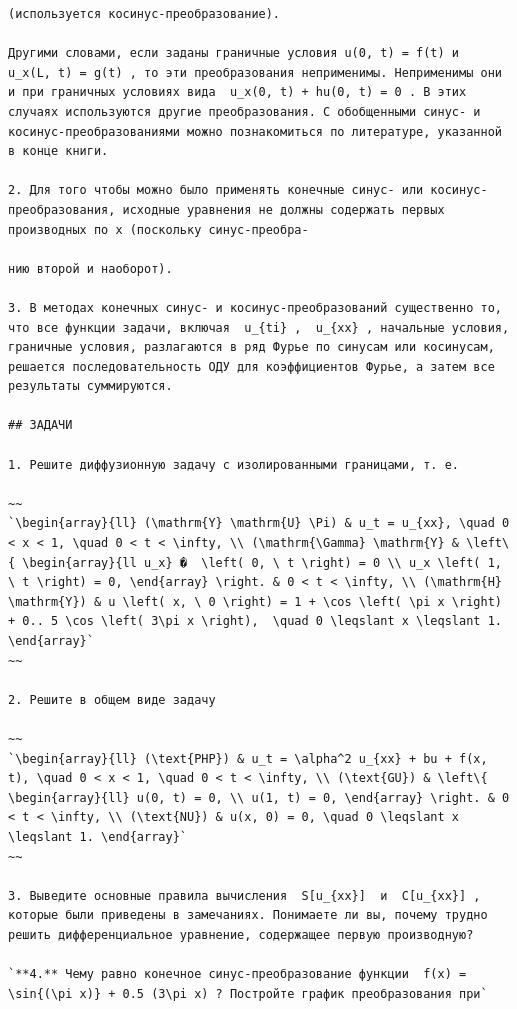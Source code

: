 \documentclass[
  ukrainian,
]{article}
\begin{document}
\begin{verbatim}
(используется косинус-преобразование).

Другими словами, если заданы граничные условия u(0, t) = f(t) и  u_x(L, t) = g(t) , то эти преобразования неприменимы. Неприменимы они и при граничных условиях вида  u_x(0, t) + hu(0, t) = 0 . В этих случаях используются другие преобразования. С обобщенными синус- и косинус-преобразованиями можно познакомиться по литературе, указанной в конце книги.

2. Для того чтобы можно было применять конечные синус- или косинус-преобразования, исходные уравнения не должны содержать первых производных по x (поскольку синус-преобра-

нию второй и наоборот).

3. В методах конечных синус- и косинус-преобразований существенно то, что все функции задачи, включая  u_{ti} ,  u_{xx} , начальные условия, граничные условия, разлагаются в ряд Фурье по синусам или косинусам, решается последовательность ОДУ для коэффициентов Фурье, а затем все результаты суммируются.

## ЗАДАЧИ

1. Решите диффузионную задачу с изолированными границами, т. е.

~~
`\begin{array}{ll} (\mathrm{Y} \mathrm{U} \Pi) & u_t = u_{xx}, \quad 0 < x < 1, \quad 0 < t < \infty, \\ (\mathrm{\Gamma} \mathrm{Y} & \left\{ \begin{array}{ll u_x} �  \left( 0, \ t \right) = 0 \\ u_x \left( 1, \ t \right) = 0, \end{array} \right. & 0 < t < \infty, \\ (\mathrm{H} \mathrm{Y}) & u \left( x, \ 0 \right) = 1 + \cos \left( \pi x \right) + 0.. 5 \cos \left( 3\pi x \right),  \quad 0 \leqslant x \leqslant 1. \end{array}`
~~

2. Решите в общем виде задачу

~~
`\begin{array}{ll} (\text{PHP}) & u_t = \alpha^2 u_{xx} + bu + f(x, t), \quad 0 < x < 1, \quad 0 < t < \infty, \\ (\text{GU}) & \left\{ \begin{array}{ll} u(0, t) = 0, \\ u(1, t) = 0, \end{array} \right. & 0 < t < \infty, \\ (\text{NU}) & u(x, 0) = 0, \quad 0 \leqslant x \leqslant 1. \end{array}`
~~

3. Выведите основные правила вычисления  S[u_{xx}]  и  C[u_{xx}] , которые были приведены в замечаниях. Понимаете ли вы, почему трудно решить дифференциальное уравнение, содержащее первую производную?

`**4.** Чему равно конечное синус-преобразование функции  f(x) = \sin{(\pi x)} + 0.5 (3\pi x) ? Постройте график преобразования при`
\end{verbatim}
\end{document}
